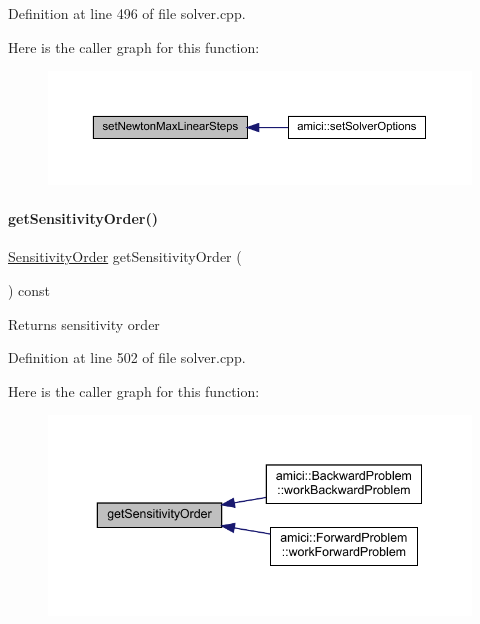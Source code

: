 Definition at line 496 of file solver.\+cpp.

Here is the caller graph for this function\+:
\nopagebreak
\begin{figure}[H]
\begin{center}
\leavevmode
\includegraphics[width=350pt]{classamici_1_1_solver_af9143ab28630d5db394f641df0a8e477_icgraph}
\end{center}
\end{figure}
\mbox{\label{classamici_1_1_solver_affde3089fec2a1cca40d6cc0c4c2cf1d}} 
\paragraph{\texorpdfstring{get\+Sensitivity\+Order()}{getSensitivityOrder()}}
{\footnotesize\ttfamily \mbox{\hyperlink{namespaceamici_aaa03ec2f8c4d5323b98d71134a462fda}{Sensitivity\+Order}} get\+Sensitivity\+Order (\begin{DoxyParamCaption}{ }\end{DoxyParamCaption}) const}

\begin{DoxyReturn}{Returns}
sensitivity order 
\end{DoxyReturn}


Definition at line 502 of file solver.\+cpp.

Here is the caller graph for this function\+:
\nopagebreak
\begin{figure}[H]
\begin{center}
\leavevmode
\includegraphics[width=343pt]{classamici_1_1_solver_affde3089fec2a1cca40d6cc0c4c2cf1d_icgraph}
\end{center}
\end{figure}
\mbox{\label{classamici_1_1_solver_a26129f061fdf7869be2d3e4aa22532b6}} 
